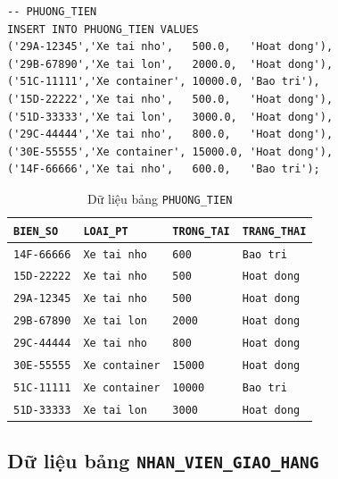 \documentclass[11pt]{report}
\begin{document}
\begin{verbatim}
-- PHUONG_TIEN
INSERT INTO PHUONG_TIEN VALUES
('29A-12345','Xe tai nho',   500.0,   'Hoat dong'),
('29B-67890','Xe tai lon',   2000.0,  'Hoat dong'),
('51C-11111','Xe container', 10000.0, 'Bao tri'),
('15D-22222','Xe tai nho',   500.0,   'Hoat dong'),
('51D-33333','Xe tai lon',   3000.0,  'Hoat dong'),
('29C-44444','Xe tai nho',   800.0,   'Hoat dong'),
('30E-55555','Xe container', 15000.0, 'Hoat dong'),
('14F-66666','Xe tai nho',   600.0,   'Bao tri');
\end{verbatim}

\begin{table}[H]
    \centering
    \renewcommand{\tabularxcolumn}[1]{m{#1}}
    \begin{tabularx}{\textwidth}{|l|l|l|>{\raggedright\arraybackslash}X|} \hline
        \rowcolor{teal!30}
        \textbf{\texttt{BIEN\_SO}} & \textbf{\texttt{LOAI\_PT}} & \textbf{\texttt{TRONG\_TAI}} & \textbf{\texttt{TRANG\_THAI}} \\ \hline
        \texttt{14F-66666} & \texttt{Xe tai nho}   & \texttt{600}   & \texttt{Bao tri} \\ \hline
        \texttt{15D-22222} & \texttt{Xe tai nho}   & \texttt{500}   & \texttt{Hoat dong} \\ \hline
        \texttt{29A-12345} & \texttt{Xe tai nho}   & \texttt{500}   & \texttt{Hoat dong} \\ \hline
        \texttt{29B-67890} & \texttt{Xe tai lon}   & \texttt{2000}  & \texttt{Hoat dong} \\ \hline
        \texttt{29C-44444} & \texttt{Xe tai nho}   & \texttt{800}   & \texttt{Hoat dong} \\ \hline
        \texttt{30E-55555} & \texttt{Xe container} & \texttt{15000} & \texttt{Hoat dong} \\ \hline
        \texttt{51C-11111} & \texttt{Xe container} & \texttt{10000} & \texttt{Bao tri} \\ \hline
        \texttt{51D-33333} & \texttt{Xe tai lon}   & \texttt{3000}  & \texttt{Hoat dong} \\ \hline
    \end{tabularx}
    \caption{Dữ liệu bảng \texttt{PHUONG\_TIEN}}
    \label{tab:data_pt}
\end{table}


\subsection{Dữ liệu bảng \texttt{NHAN\_VIEN\_GIAO\_HANG}}
\end{document}
